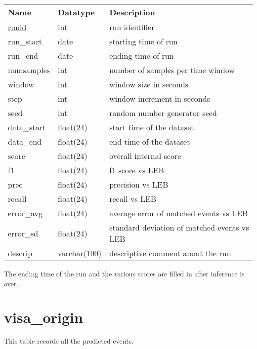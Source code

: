 \begin{center}
\begin{tabular}{|l|l|l|}
\hline
\bf{Name} & \bf{Datatype} & \bf{Description} \\
\hline
 \underline{runid}      &     int  & run identifier\\
 run\_start  &     date & starting time of run\\
 run\_end    &     date & ending time of run\\
 numsamples &     int & number of samples per time window\\
 window     &     int & window size in seconds \\
 step       &     int & window increment in seconds \\
 seed       &     int & random number generator seed \\
 data\_start &     float(24) & start time of the dataset \\
 data\_end   &     float(24) & end time of the dataset \\
 score      &     float(24) & overall internal score \\
 f1         &     float(24) & f1 score vs LEB \\
 prec       &     float(24) & precision vs LEB \\
 recall     &     float(24) & recall vs LEB \\
 error\_avg  &     float(24) & average error of matched events vs LEB \\
 error\_sd   &     float(24) & standard deviation of matched events vs LEB\\
 descrip    &     varchar(100) & descriptive comment about the run \\
\hline
\end{tabular}
\end{center}

The ending time of the run and the various scores are filled in after
inference is over.

\section{visa\_origin}\label{tbl-visa-origin}

This table records all the predicted events.


